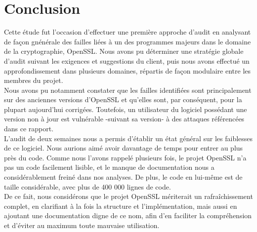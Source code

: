 \section*{Conclusion}

Cette étude fut l'occasion d'effectuer une première approche d'audit en analysant de façon gnénérale des failles liées à un des programmes majeurs dans le domaine de la cryptographie, OpenSSL. Nous avons pu déterminer une stratégie globale d'audit suivant les exigences et suggestions du client, puis nous avons effectué un approfondissement dans plusieurs domaines, répartis de façon modulaire entre les membres du projet.\\


Nous avons pu notamment constater que les failles identifiées sont principalement sur des anciennes versions d'OpenSSL et qu'elles sont, par conséquent, pour la plupart aujourd'hui corrigées. Toutefois, un utilisateur du logiciel possédant une version non à jour est vulnérable -suivant sa version- à des attaques référencées dans ce rapport. \\


L'audit de deux semaines nous a permis d'établir un état général sur les faiblesses de ce logiciel. Nous aurions aimé avoir davantage de temps pour entrer au plus près du code. Comme nous l'avons rappelé plusieurs fois, le projet OpenSSL n'a pas un code facilement lisible, et le manque de documentation nous a considérablement freiné dans nos analyses. De plus, le code en lui-même est de taille considérable, avec plus de 400 000 lignes de code.\\


De ce fait, nous considérons que le projet OpenSSL mériterait un rafraîchissement complet, en clarifiant à la fois la structure et l'implémentation, mais aussi en ajoutant une documentation digne de ce nom, afin d'en faciliter la compréhension et d'éviter au maximum toute mauvaise utilisation.  















